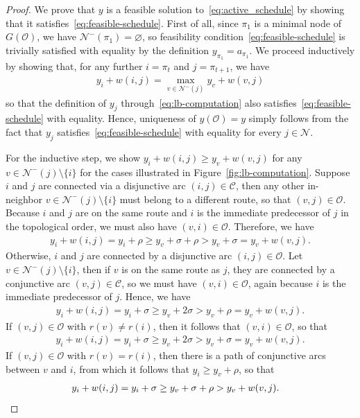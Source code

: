 \documentclass[a4paper]{report}
\theoremstyle{definition}
\theoremstyle{plain}
\begin{document}
\lblemma*
\begin{proof}
  We prove that $y$ is a feasible solution to~\eqref{eq:active_schedule} by showing that it satisfies~\eqref{eq:feasible-schedule}.
  First of all, since $\pi_1$ is a minimal node of $G(\mathcal{O})$, we have
  $\mathcal{N}^-(\pi_1) = \varnothing$, so feasibility
  condition~\eqref{eq:feasible-schedule} is trivially satisfied with equality by
  the definition $y_{\pi_1} = a_{\pi_1}$. We proceed inductively by showing
  that, for any further $i = \pi_t$ and $j = \pi_{t+1}$, we have
  \begin{align}
    \label{eq:max-arc}
    y_i + w(i,j) = \max_{v \in \mathcal{N}^-(j)} y_v + w(v,j)
  \end{align}
  so that the definition of $y_j$ through~\eqref{eq:lb-computation} also
  satisfies~\eqref{eq:feasible-schedule} with equality.
  Hence, uniqueness of $y(\mathcal{O}) = y$ simply follows from the fact that
  $y_j$ satisfies~\eqref{eq:feasible-schedule} with equality for every
  $j \in \mathcal{N}$.

  For the inductive step, we show $y_{i} + w(i,j) \geq y_{v} + w(v,j)$ for any
  $v \in \mathcal{N}^{-}(j) \setminus \{i\}$ for the cases illustrated in
  Figure~\ref{fig:lb-computation}.
  Suppose $i$ and $j$ are connected via a disjunctive arc $(i,j) \in \mathcal{C}$,
  then any other in-neighbor $v \in \mathcal{N}^-(j) \setminus \{ i \}$ must
  belong to a different route, so that $(v,j) \in \mathcal{O}$. Because $i$ and
  $j$ are on the same route and $i$ is the immediate predecessor of $j$ in the
  topological order, we must also have $(v,i) \in \mathcal{O}$. Therefore, we have
  \begin{align*}
    y_i + w(i,j) = y_i + \rho \geq y_v + \sigma + \rho > y_v + \sigma = y_v + w(v,j) .
  \end{align*}
  Otherwise, $i$ and $j$ are connected by a disjunctive arc
  $(i,j) \in \mathcal{O}$. Let $v \in \mathcal{N}^-(j) \setminus \{i\}$, then if
  $v$ is on the same route as $j$, they are connected by a conjunctive arc
  $(v,j) \in \mathcal{C}$, so we must have $(v,i) \in \mathcal{O}$, again because
  $i$ is the immediate predecessor of $j$. Hence, we have
  \begin{align*}
    y_i + w(i,j) = y_i + \sigma \geq y_v + 2 \sigma > y_{v} + \rho = y_{v} + w(v,j) .
  \end{align*}
  If $(v, j) \in \mathcal{O}$ with $r(v) \neq r(i)$, then it follows that
  $(v,i) \in \mathcal{O}$, so that
  \begin{align*}
    y_{i} + w(i,j) = y_i + \sigma \geq y_v + 2\sigma > y_v + \sigma = y_v + w(v,j) .
  \end{align*}
  If $(v, j) \in \mathcal{O}$ with $r(v) = r(i)$, then there is a path of
  conjunctive arcs between $v$ and $i$, from which it follows that
  $y_i \geq y_{v} + \rho$, so that
  \begin{align*}
    y_i + w(i,j) = y_i + \sigma \geq y_v + \sigma + \rho > y_v + w(v, j) . & \qedhere
  \end{align*}
\end{proof}
\end{document}
